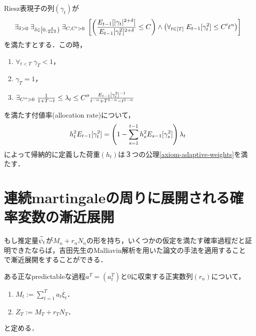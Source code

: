 \documentclass[uplatex,dvipdfmx]{jsreport}
\begin{document}
\begin{theorem}[荷重の構成]
    Riesz表現子の列$(\gamma_t)$が
    \[\exists_{\delta>0}\;\exists_{\delta\in\left[0,\frac{\delta}{2+\delta}\right)}\;\exists_{C,C'>0}\;\left[\left(\frac{E_{t-1}[\lvert\gamma_t\rvert^{2+\delta}]}{E_{t-1}[\gamma^2_t]^{2+\delta}}\le C\right)\land\left(\forall_{t\in[T]}\;E_{t-1}[\gamma^2_t]\le C't^\alpha\right)\right]\]
    を満たすとする．この時，
    \begin{enumerate}
        \item $\forall_{t<T}\;\gamma_T<1$，
        \item $\gamma_T=1$，
        \item $\exists_{C''>0}\;\frac{1}{1+T-t}\le\lambda_t\le C''\frac{E_{t-1}[\gamma^2_t]^{-1}}{t^{-\alpha}+T^{1-\alpha}-t^{1-\alpha}}$
    \end{enumerate}
    を満たす付値率(allocation rate)について，
    \[h^2_tE_{t-1}[\gamma_t^2]=\left(1-\sum^{t-1}_{s=1}h_s^2E_{s-1}[\gamma_s^2]\right)\lambda_t\]
    によって帰納的に定義した荷重$(h_t)$は３つの公理\ref{axiom-adaptive-weights}を満たす．
\end{theorem}

\section{連続martingaleの周りに展開される確率変数の漸近展開}

\begin{tcolorbox}[colframe=ForestGreen, colback=ForestGreen!10!white,breakable,colbacktitle=ForestGreen!40!white,coltitle=black,fonttitle=\bfseries\sffamily,
title=]
    もし推定量$\widehat{\psi}_t$が$M_n+r_nN_n$の形を持ち，いくつかの仮定を満たす確率過程だと証明できたならば，吉田先生のMalliavin解析を用いた論文の手法を適用することで漸近展開をすることができる．
\end{tcolorbox}

\begin{definition}
    ある正なpredictableな過程$a^T=(a^T_t)$と$0$に収束する正実数列$(r_n)$について，
    \begin{enumerate}
        \item $M_t:=\sum^T_{t=1}a_t\dot{\xi_t}$．
        \item $Z_T:=M_T+r_TN_T$．
    \end{enumerate}
    と定める．
\end{definition}
\end{document}
